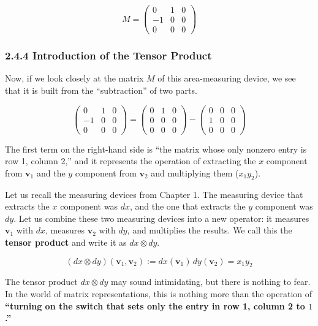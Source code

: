 \[
M = \begin{pmatrix}
  0 & 1 & 0 \\
  -1 & 0 & 0 \\
  0 & 0 & 0
\end{pmatrix}
\]

\hypertarget{introduction-of-the-tensor-product}{%
\subsubsection{2.4.4 Introduction of the Tensor
Product}\label{introduction-of-the-tensor-product}}

Now, if we look closely at the matrix \(M\) of this area-measuring
device, we see that it is built from the ``subtraction'' of two parts.

\[
\begin{pmatrix} 0 & 1 & 0 \\ -1 & 0 & 0 \\ 0 & 0 & 0 \end{pmatrix}
= \begin{pmatrix} 0 & 1 & 0 \\ 0 & 0 & 0 \\ 0 & 0 & 0 \end{pmatrix} -
\begin{pmatrix} 0 & 0 & 0 \\ 1 & 0 & 0 \\ 0 & 0 & 0 \end{pmatrix}
\]

The first term on the right-hand side is ``the matrix whose only nonzero
entry is row 1, column 2,'' and it represents the operation of
extracting the \(x\) component from \(\mathbf{v}_1\) and the \(y\)
component from \(\mathbf{v}_2\) and multiplying them (\(x_1 y_2\)).

Let us recall the measuring devices from Chapter 1. The measuring device
that extracts the \(x\) component was \(dx\), and the one that extracts
the \(y\) component was \(dy\). Let us combine these two measuring
devices into a new operator: it measures \(\mathbf{v}_1\) with \(dx\),
measures \(\mathbf{v}_2\) with \(dy\), and multiplies the results. We
call this the \textbf{tensor product} and write it as \(dx \otimes dy\).

\[(dx \otimes dy)(\mathbf{v}_1, \mathbf{v}_2) := dx(\mathbf{v}_1)\,dy(\mathbf{v}_2) = x_1 y_2\]

The tensor product \(dx \otimes dy\) may sound intimidating, but there
is nothing to fear. In the world of matrix representations, this is
nothing more than the operation of \textbf{``turning on the switch that
sets only the entry in row 1, column 2 to \(1\).''}

